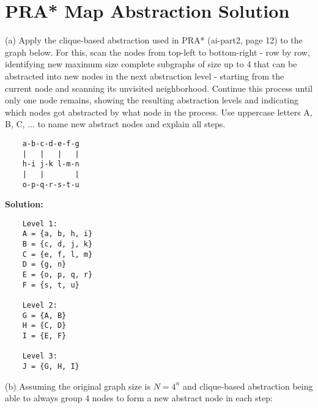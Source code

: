 \documentclass{article}
\begin{document}
\section*{PRA* Map Abstraction Solution}

(a) Apply the clique-based abstraction used in PRA* (ai-part2, page 12) to the graph below. For this, scan the nodes from top-left to bottom-right - row by row, identifying new maximum size complete subgraphs of size up to 4 that can be abstracted into new nodes in the next abstraction level - starting from the current node and scanning its unvisited neighborhood. Continue this process until only one node remains, showing the resulting abstraction levels and indicating which nodes got abstracted by what node in the process. Use uppercase letters A, B, C, ... to name new abstract nodes and explain all steps.

\begin{verbatim}
    a-b-c-d-e-f-g
    |   |   |   |
    h-i j-k l-m-n
    |   |       |
    o-p-q-r-s-t-u
\end{verbatim}

\textbf{Solution:}

\begin{verbatim}
    Level 1:
    A = {a, b, h, i}
    B = {c, d, j, k}
    C = {e, f, l, m}
    D = {g, n}
    E = {o, p, q, r}
    F = {s, t, u}

    Level 2:
    G = {A, B}
    H = {C, D}
    I = {E, F}

    Level 3:
    J = {G, H, I}
\end{verbatim}

(b) Assuming the original graph size is $N = 4^n$ and clique-based abstraction being able to always group 4 nodes to form a new abstract node in each step:
\end{document}

